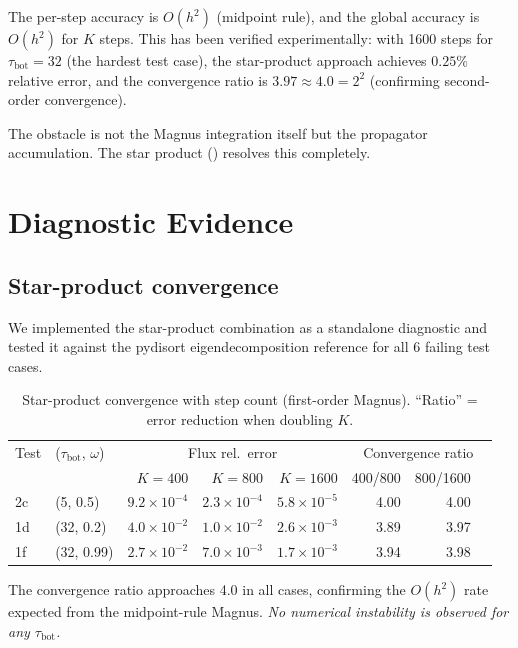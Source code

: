 \documentclass[11pt,a4paper]{article}
\newcommand{\tbot}{\tau_{\mathrm{bot}}}
\theoremstyle{definition}
\begin{document}
The per-step accuracy is $O(h^2)$ (midpoint rule), and the global accuracy
is $O(h^2)$ for $K$ steps.  This has been verified experimentally: with
1600 steps for $\tbot=32$ (the hardest test case), the star-product approach
achieves $0.25\%$ relative error, and the convergence ratio is
$3.97\approx 4.0 = 2^2$ (confirming second-order convergence).

The obstacle is not the Magnus integration itself but the propagator
accumulation.  The star product () resolves this
completely.


\section{Diagnostic Evidence}\label{sec:diagnostics}

\subsection{Star-product convergence}
We implemented the star-product combination as a standalone diagnostic
and tested it against the pydisort eigendecomposition reference for all
6 failing test cases.

\begin{table}[h]\centering
\caption{Star-product convergence with step count (first-order Magnus).
``Ratio'' = error reduction when doubling $K$.}\label{tab:convergence}
\begin{tabular}{ll|rrr|rrr}
\toprule
Test & ($\tbot$, $\omega$)
  & \multicolumn{3}{c|}{Flux rel.\ error}
  & \multicolumn{3}{c}{Convergence ratio} \\
  & & $K\!=\!400$ & $K\!=\!800$ & $K\!=\!1600$
  & 400/800 & 800/1600 \\
\midrule
2c & (5, 0.5)     & $9.2\times 10^{-4}$ & $2.3\times 10^{-4}$ & $5.8\times 10^{-5}$ & 4.00 & 4.00 \\
1d & (32, 0.2)    & $4.0\times 10^{-2}$ & $1.0\times 10^{-2}$ & $2.6\times 10^{-3}$ & 3.89 & 3.97 \\
1f & (32, 0.99)   & $2.7\times 10^{-2}$ & $7.0\times 10^{-3}$ & $1.7\times 10^{-3}$ & 3.94 & 3.98 \\
\bottomrule
\end{tabular}
\end{table}

The convergence ratio approaches 4.0 in all cases, confirming the $O(h^2)$
rate expected from the midpoint-rule Magnus.  \emph{No numerical instability
is observed for any $\tbot$.}
\end{document}

